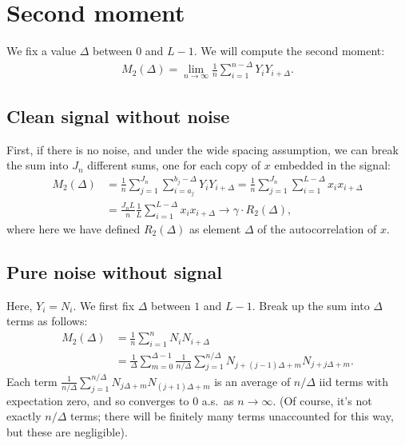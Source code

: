 \documentclass{article}
\theoremstyle{thm}
\theoremstyle{definition}
\newcommand{\1}{\mathbf{1}}
\begin{document}
%
%
%

\section{Second moment}

We fix a value $\Delta$ between $0$ and $L-1$. We will compute the second moment:
%
\begin{align}
%
    M_2(\Delta) = 
        \lim_{n \to \infty} \frac{1}{n} \sum_{i=1}^{n-\Delta} Y_i Y_{i+\Delta}.
%
\end{align}


%
%
%

\subsection{Clean signal without noise}

First, if there is no noise, and under the wide spacing assumption, we can break the sum into $J_n$ different sums, one for each copy of $x$ embedded in the signal:
%
\begin{align}
%
    M_2(\Delta) 
        &= \frac{1}{n} \sum_{j=1}^{J_n} \sum_{i=a_j}^{b_j-\Delta} Y_i Y_{i+\Delta}
        = \frac{1}{n} \sum_{j=1}^{J_n} \sum_{i=1}^{L-\Delta} x_i x_{i+\Delta}
    \nonumber \\
    &= \frac{J_n L}{n} \frac{1}{L} \sum_{i=1}^{L-\Delta} x_i x_{i+\Delta}
        \to \gamma \cdot R_2(\Delta),
%
\end{align}
%
where here we have defined $R_2(\Delta)$ as element $\Delta$ of the autocorrelation of $x$. 
%
%
%

\subsection{Pure noise without signal}

Here, $Y_i = N_i$. We first fix $\Delta$ between $1$ and $L-1$. Break up the sum into $\Delta$ terms as follows:
%
\begin{align}
%
    M_2(\Delta) &=\frac{1}{n} \sum_{i=1}^n N_i  N_{i+\Delta}
        \nonumber \\
    &= \frac{1}{\Delta} \sum_{m=0}^{\Delta-1} \frac{1}{n/\Delta}\sum_{j=1}^{n/\Delta} 
        N_{j+(j-1)\Delta + m} N_{j + j\Delta + m}.
%
\end{align}
%
Each term
%
\begin{math}
    \frac{1}{n/\Delta}\sum_{j=1}^{n/\Delta} 
        N_{j\Delta + m} N_{(j + 1)\Delta + m}
\end{math}
%
is an average of $n / \Delta$ iid terms with expectation zero, and so converges to 0 a.s.\ as $n \to \infty$. (Of course, it's not exactly $n / \Delta$ terms; there will be finitely many terms unaccounted for this way, but these are negligible).
\end{document}
